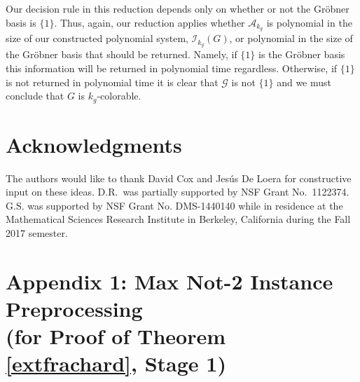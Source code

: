 \documentclass{article}
\newcommand{\A}[0]{\mathcal{A}}
\begin{document}
Our decision rule in this reduction depends only on whether or not the Gr\"{o}bner basis is $\{1\}$. Thus, again, our reduction applies whether  $\A_{k_g}$ is polynomial in the size of our constructed polynomial system, $\mathcal{I}_{k_g}(G)$, or polynomial in the size of the Gr\"{o}bner basis that should be returned. Namely, if $\{1\}$ is the Gr\"{o}bner basis this information will be returned in polynomial time regardless. Otherwise, if $\{1\}$ is not returned in polynomial time it is clear that $\mathcal{G}$ is not $\{1\}$ and we must conclude that $G$ is $k_g$\nobreakdash-colorable.

































\section*{Acknowledgments}
\noindent The authors would like to thank David Cox and Jes\'us De Loera for constructive input on these ideas.  D.R.~was partially supported by NSF Grant No.~1122374. G.S. was supported  by NSF Grant No. DMS-1440140 while in residence at the Mathematical Sciences Research Institute in Berkeley, California during the Fall 2017 semester.




\section*{Appendix 1:  Max Not-2 Instance Preprocessing \\(for Proof of Theorem \ref{extfrachard}, Stage 1)}
\end{document}
